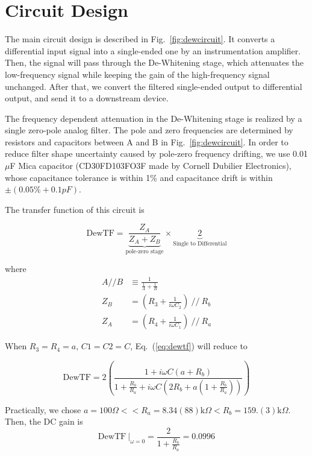 \section{Circuit Design}
The main circuit design is described in Fig.~\ref{fig:dewcircuit}. It converts a differential input signal into a single-ended one by an instrumentation amplifier. Then, the signal will pass through the De-Whitening stage, which attenuates the low-frequency signal while keeping the gain of the high-frequency signal unchanged. After that, we convert the filtered single-ended output to differential output, and send it to a downstream device.


The frequency dependent attenuation in the De-Whitening stage is realized by a single zero-pole analog filter. The pole and zero frequencies are determined by resistors and capacitors between A and B in Fig.~\ref{fig:dewcircuit}. In order to reduce filter shape uncertainty caused by pole-zero frequency drifting, we use 0.01$\mu$F Mica capacitor (CD30FD103FO3F made by Cornell Dubilier Electronics), whose capacitance tolerance is within 1\% and capacitance drift is within $\pm(0.05\% +0.1 pF)$.

The transfer function of this circuit is

\begin{equation}
\label{eq:dewtf}
    \mathrm{DewTF} = \underbrace{\frac{Z_A}{Z_A+Z_B}}_{\text{pole-zero stage}} \times \underbrace{2}_{\text{Single to Differential}}
\end{equation}


where
\begin{align}
    A//B &\equiv \frac{1}{\frac{1}{A}+\frac{1}{B}} \\
    Z_B &= ( R_3 + \frac{1}{i \omega C_2} )~ //~ R_b \\
    Z_A &= ( R_4 + \frac{1}{i \omega C_1} )~ //~ R_a
\end{align}

When $R_3=R_4=a$, $C1=C2=C$, Eq.~(\ref{eq:dewtf}) will reduce to 

\begin{equation}
    \mathrm{DewTF} = 2 \left( \frac{1+i \omega C (a+ R_b)}{1+\frac{R_b}{R_a} + i \omega C (2 R_b + a(1+\frac{R_b}{R_a}))} \right)
\end{equation}

Practically, we chose $a=100\Omega << R_a =8.34(88)\mathrm{k}\Omega < R_b =159.(3)\mathrm{k}\Omega $. Then, the DC gain is 
\begin{equation}
    \mathrm{DewTF}\ \rvert_{\omega=0} = \frac{2}{1+\frac{R_b}{R_a}} = 0.0996
\end{equation}

